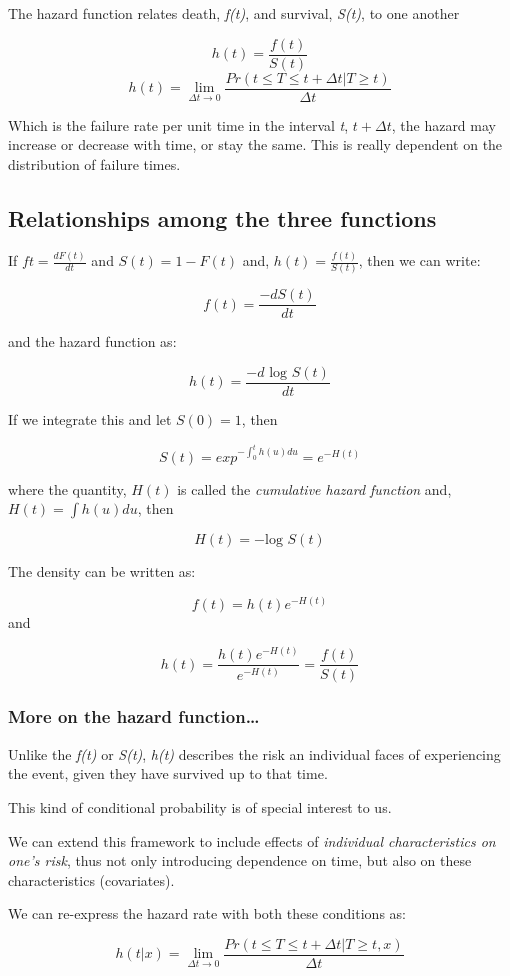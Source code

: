 \documentclass[
]{article}
\begin{document}
The hazard function relates death, \emph{f(t)}, and survival, \emph{S(t)}, to one another

\[h(t) = \frac{f(t)}{S(t)}\]
\[h(t) = \lim_{\Delta t \rightarrow 0} \frac{Pr(t \leqslant T \leqslant t + \Delta t | T \geqslant t)}{\Delta t}\]

Which is the failure rate per unit time in the interval \emph{t}, \(t+\Delta t\), the hazard may increase or decrease with time, or stay the same. This is really dependent on the distribution of failure times.

\hypertarget{relationships-among-the-three-functions}{%
\subsection{Relationships among the three functions}\label{relationships-among-the-three-functions}}

If \(ft = \frac{dF(t)}{dt}\) and \(S(t) = 1- F(t)\) and, \(h(t) = \frac{f(t)}{S(t)}\), then we can write:

\[f(t) = \frac{-dS(t)}{dt}\]

and the hazard function as:

\[h(t) = \frac{-d \text{ log } S(t)}{dt}\]

If we integrate this and let \(S(0)=1\), then

\[S(t) = exp^{-\int_{0}^t h(u) du} = e^{-H(t)}\]

where the quantity, \(H(t)\) is called the \emph{cumulative hazard function} and, \(H(t) = \int h(u) du\), then

\[H(t) = -\text{log }  S(t)\]

The density can be written as:

\[f(t) = h(t) e ^{-H(t)}\]
and

\[h(t) = \frac{h(t) e^{-H(t)}}{e^{-H(t)}} = \frac{f(t)}{S(t)}\]

\hypertarget{more-on-the-hazard-function}{%
\subsubsection{More on the hazard function\ldots{}}\label{more-on-the-hazard-function}}

Unlike the \emph{f(t)} or \emph{S(t)}, \emph{h(t)} describes the risk an individual faces of experiencing the event, given they have survived up to that time.

This kind of conditional probability is of special interest to us.

We can extend this framework to include effects of \emph{individual characteristics on one's risk}, thus not only introducing dependence on time, but also on these characteristics (covariates).

We can re-express the hazard rate with both these conditions as:

\[h(t|x) = \lim_{\Delta t \rightarrow 0} \frac{Pr(t \leqslant T \leqslant t + \Delta t | T \geqslant t, x)}{\Delta t}\]

  
\end{document}
